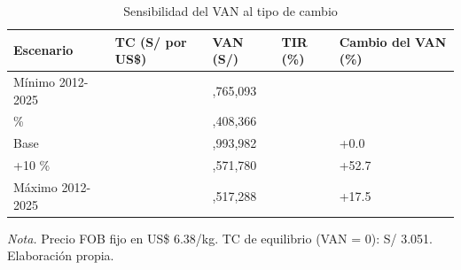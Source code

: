 \begin{table}[H]
\centering
\small
\caption{Sensibilidad del VAN al tipo de cambio}
\label{tab:tabla8_sensibilidad_tc}
\begin{tabularx}{\linewidth}{>{\raggedright\arraybackslash}X>{\raggedleft\arraybackslash}X>{\raggedleft\arraybackslash}X>{\raggedleft\arraybackslash}X>{\raggedleft\arraybackslash}X}
\toprule
\textbf{Escenario} & \textbf{TC (S/ por US\$)} & \textbf{VAN (S/)} & \textbf{TIR (\%)} & \textbf{Cambio del VAN (\%)} \\
\midrule
Mínimo 2012-2025 & 2.638 & -1,765,093 & -0.7 & -159.0 \\
-10 \% & 3.381 & 1,408,366 & 19.7 & -53.0 \\
Base & 3.757 & 2,993,982 & 27.0 & +0.0 \\
+10 \% & 4.132 & 4,571,780 & 33.4 & +52.7 \\
Máximo 2012-2025 & 3.881 & 3,517,288 & 29.3 & +17.5 \\
\bottomrule
\end{tabularx}
\par\vspace{2pt}\parbox{\linewidth}{\footnotesize\textit{Nota.} Precio FOB fijo en US\$ 6.38/kg. TC de equilibrio (VAN = 0): S/ 3.051. Elaboración propia.}
\end{table}
